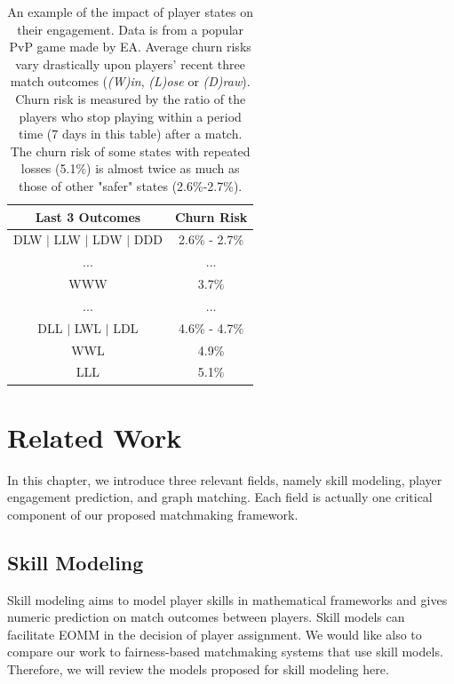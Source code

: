 \begin{table}[tb]
\centering
\caption{
An example of the impact of player states on their engagement. Data is from a popular PvP game made by EA. Average churn risks vary drastically upon players' recent three match outcomes (\emph{(W)in}, \emph{(L)ose} or \emph{(D)raw}). Churn risk is measured by the ratio of the players who stop playing within a period time (7 days in this table) after a match. The churn risk of some states with repeated losses (5.1\%) is almost twice as much as those of other "safer" states (2.6\%-2.7\%).
} \label{tab:churnrate}
\vspace{2mm}
\begin{tabular}{|c|c|}
\hline
Last 3 Outcomes & Churn Risk                      \\ \hline
DLW $|$ LLW $|$ LDW $|$ DDD      &  2.6\% - 2.7\%        \\
... & ...  \\
WWW   &  3.7\% \\
... & ... \\
DLL $|$ LWL $|$ LDL  &  4.6\% - 4.7\%  \\
WWL & 4.9\% \\
LLL & 5.1\% \\
\hline
\end{tabular}
\end{table}


\section{Related Work}\label{sec:review}

In this chapter, we introduce three relevant fields, namely skill modeling, player engagement prediction, and graph matching. Each field is actually one critical component of our proposed matchmaking framework.


\subsection{Skill Modeling}\label{sec:skill_review}
Skill modeling aims to model player skills in mathematical frameworks and gives numeric  prediction on match outcomes between players. Skill models can facilitate EOMM in the decision of player assignment. We would like also to compare our work to fairness-based matchmaking systems that use skill models.  Therefore, we will review the models proposed for skill modeling here. 

